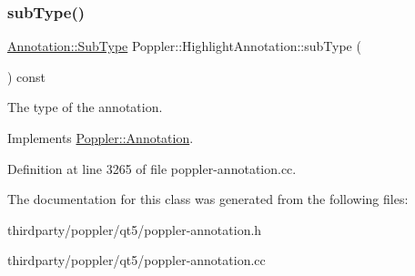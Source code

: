 \mbox{\label{class_poppler_1_1_highlight_annotation_ab71e12c01a8005c2fb4a4db9c218c8da}} 
\subsubsection{\texorpdfstring{sub\+Type()}{subType()}}
{\footnotesize\ttfamily \hyperlink{class_poppler_1_1_annotation_a2d592999c330949d64679cfa9e81113f}{Annotation\+::\+Sub\+Type} Poppler\+::\+Highlight\+Annotation\+::sub\+Type (\begin{DoxyParamCaption}{ }\end{DoxyParamCaption}) const\hspace{0.3cm}{\ttfamily [virtual]}}

The type of the annotation. 

Implements \hyperlink{class_poppler_1_1_annotation_aef7fa1532193b41fbeba6e577579d984}{Poppler\+::\+Annotation}.



Definition at line 3265 of file poppler-\/annotation.\+cc.



The documentation for this class was generated from the following files\+:\begin{DoxyCompactItemize}
\item 
thirdparty/poppler/qt5/poppler-\/annotation.\+h\item 
thirdparty/poppler/qt5/poppler-\/annotation.\+cc\end{DoxyCompactItemize}
